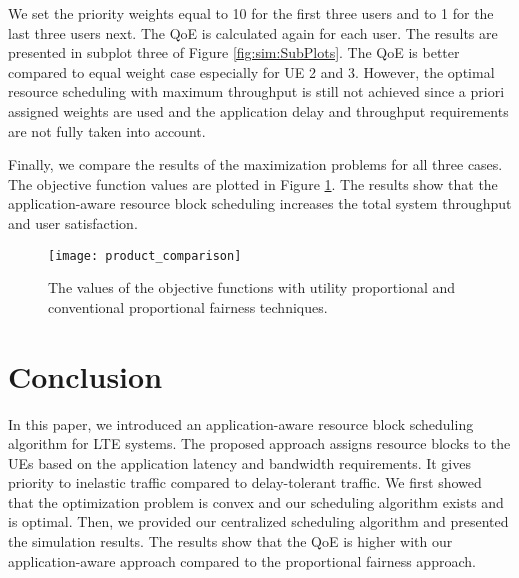 \documentclass[conference]{IEEEtran}
\begin{document}
We set the priority weights equal to 10 for the first three users and to 1 for the last three users next. The QoE is calculated again for each user. The results are presented in subplot three of Figure \ref{fig:sim:SubPlots}. The QoE is better compared to equal weight case especially for UE 2 and 3. However, the optimal resource scheduling with maximum throughput is still not achieved since a priori assigned weights are used and the application delay and throughput requirements are not fully taken into account.  



Finally, we compare the results of the maximization problems for all three cases. The objective function values are plotted in Figure \ref{fig:sim:product_comparison}. The results show that the application-aware resource block scheduling increases the total system throughput and user satisfaction. 

\begin{figure}
    \centering
    \texttt{[image: product\_comparison]}
    \caption{The values of the objective functions with utility proportional and conventional proportional fairness techniques.}
    \label{fig:sim:product_comparison}
\end{figure} 



\section{Conclusion}\label{sec:conclude}
In this paper, we introduced an application-aware resource block scheduling algorithm for LTE systems. The proposed approach assigns resource blocks to the UEs based on the application latency and bandwidth requirements. It gives priority to inelastic traffic compared to delay-tolerant traffic. We first showed that the optimization problem is convex and our scheduling algorithm exists and is optimal. Then, we provided our centralized scheduling algorithm and presented the simulation results. The results show that the QoE is higher with our application-aware approach compared to the proportional fairness approach.   


\end{document}
